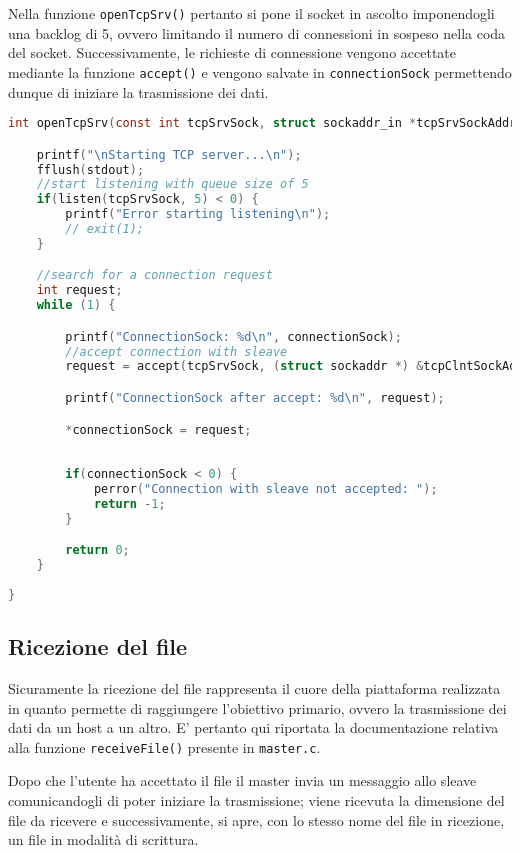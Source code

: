 \documentclass[11pt,fleqn]{book} %
\begin{document}
Nella funzione \texttt{openTcpSrv()} pertanto si pone il socket in ascolto imponendogli una backlog di 5, ovvero limitando il numero di connessioni in sospeso nella coda del socket. Successivamente, le richieste di connessione vengono accettate mediante la funzione \texttt{accept()} e vengono salvate in \texttt{connectionSock} permettendo dunque di iniziare la trasmissione dei dati.
\begin{lstlisting}[language=C]
int openTcpSrv(const int tcpSrvSock, struct sockaddr_in *tcpSrvSockAddr, const int tcpSrvSockAddrLen, struct sockaddr_in *tcpClntSockAddr, int tcpClntSockAddrLen, int *connectionSock) {

	printf("\nStarting TCP server...\n");
	fflush(stdout);
	//start listening with queue size of 5
	if(listen(tcpSrvSock, 5) < 0) {
		printf("Error starting listening\n");
		// exit(1);
	}

	//search for a connection request
	int request;
	while (1) {

		printf("ConnectionSock: %d\n", connectionSock);
		//accept connection with sleave
		request = accept(tcpSrvSock, (struct sockaddr *) &tcpClntSockAddr, &tcpClntSockAddrLen);

		printf("ConnectionSock after accept: %d\n", request);

		*connectionSock = request;
		
		
		if(connectionSock < 0) {
			perror("Connection with sleave not accepted: ");
			return -1;
		}

		return 0;
	}
	
}
\end{lstlisting}

\subsection{Ricezione del file}
Sicuramente la ricezione del file rappresenta il cuore della piattaforma realizzata in quanto permette di raggiungere l'obiettivo primario, ovvero la trasmissione dei dati da un host a un altro. E' pertanto qui riportata la documentazione relativa alla funzione \texttt{receiveFile()} presente in \texttt{master.c}.

Dopo che l'utente ha accettato il file il master invia un messaggio allo sleave comunicandogli di poter iniziare la trasmissione; viene ricevuta la dimensione del file da ricevere e successivamente, si apre, con lo stesso nome del file in ricezione, un file in modalità di scrittura.
\end{document}
